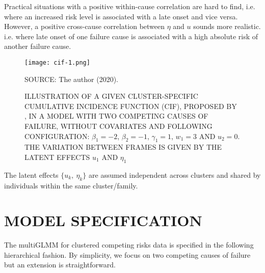 Practical situations with a positive within-cause correlation are hard
to find, i.e. where an increased risk level is associated with a late
onset and vice versa. However, a positive cross-cause correlation
between \(\eta\) and \(u\) sounds more realistic. i.e. where late onset
of one failure cause is associated with a high absolute risk of another
failure cause.

\begin{figure}[H]
  \setlength{\abovecaptionskip}{.0001pt}
  \caption{ILLUSTRATION OF A GIVEN CLUSTER-SPECIFIC CUMULATIVE INCIDENCE
    FUNCTION (CIF), PROPOSED BY , IN A MODEL WITH
    TWO COMPETING CAUSES OF FAILURE, WITHOUT COVARIATES AND FOLLOWING
    CONFIGURATION: \(\beta_{1} = -2\), \(\beta_{2} = -1\), \(\gamma_{1}
    = 1\), \(w_{1} = 3\) AND \(u_{2} = 0\). THE VARIATION BETWEEN FRAMES
    IS GIVEN BY THE LATENT EFFECTS \(u_{1}\) AND \(\eta_{1}\)}
  \vspace{0.3cm} \centering
  \texttt{[image: cif-1.png]}
  \\
  \begin{footnotesize}
    SOURCE: The author (2020).
  \end{footnotesize}
  \label{fig:cif}
\end{figure}

The latent effects \(\{u_{k},~\eta_{k}\}\) are assumed independent
across clusters and shared by individuals within the same
cluster/family.

\section{MODEL SPECIFICATION}
\label{cap:modelitself}

The multiGLMM for clustered competing risks data is specified in the
following hierarchical fashion. By simplicity, we focus on two competing
causes of failure but an extension is straightforward.


